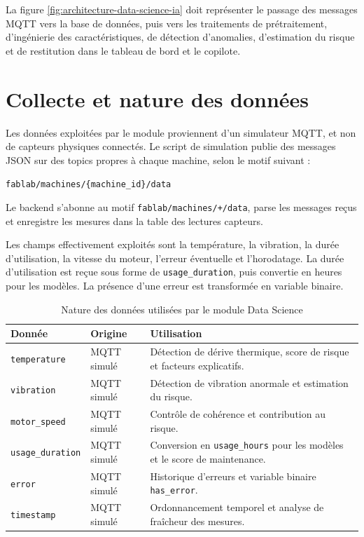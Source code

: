 La figure \ref{fig:architecture-data-science-ia} doit représenter le passage des messages MQTT vers la base de données, puis vers les traitements de prétraitement, d'ingénierie des caractéristiques, de détection d'anomalies, d'estimation du risque et de restitution dans le tableau de bord et le copilote.

\section{Collecte et nature des données}

Les données exploitées par le module proviennent d'un simulateur MQTT, et non de capteurs physiques connectés. Le script de simulation publie des messages JSON sur des topics propres à chaque machine, selon le motif suivant :

\begin{center}
\small\texttt{fablab/machines/\{machine\_id\}/data}
\end{center}

Le backend s'abonne au motif \texttt{fablab/machines/+/data}, parse les messages reçus et enregistre les mesures dans la table des lectures capteurs.

Les champs effectivement exploités sont la température, la vibration, la durée d'utilisation, la vitesse du moteur, l'erreur éventuelle et l'horodatage. La durée d'utilisation est reçue sous forme de \texttt{usage\_duration}, puis convertie en heures pour les modèles. La présence d'une erreur est transformée en variable binaire.

\begin{table}[H]
\centering
\small
\caption{Nature des données utilisées par le module Data Science}
\label{tab:donnees-ds-ia}
\begin{tabular}{|p{}|p{}|p{}|}
\hline
\rowcolor{SectionColor!12}
\textbf{Donnée} & \textbf{Origine} & \textbf{Utilisation} \\
\hline
\texttt{temperature} & MQTT simulé & Détection de dérive thermique, score de risque et facteurs explicatifs. \\
\hline
\texttt{vibration} & MQTT simulé & Détection de vibration anormale et estimation du risque. \\
\hline
\texttt{motor\_speed} & MQTT simulé & Contrôle de cohérence et contribution au risque. \\
\hline
\texttt{usage\_duration} & MQTT simulé & Conversion en \texttt{usage\_hours} pour les modèles et le score de maintenance. \\
\hline
\texttt{error} & MQTT simulé & Historique d'erreurs et variable binaire \texttt{has\_error}. \\
\hline
\texttt{timestamp} & MQTT simulé & Ordonnancement temporel et analyse de fraîcheur des mesures. \\
\hline
\end{tabular}
\end{table}


